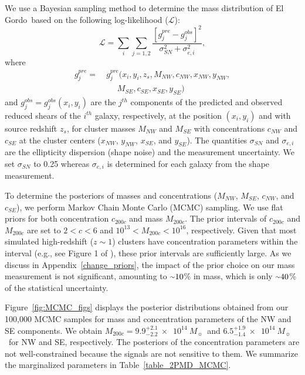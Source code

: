 \documentclass[twocolumn]{aastex631}
\newcommand{\elgordo}{El Gordo}
\newcommand{\mytilde}{\raise.19ex\hbox{$\scriptstyle\sim$}}
\newcommand{\solarm}{$10^{14}~M_{\sun}$}
\begin{document}
We use a Bayesian sampling method to determine the mass distribution of \elgordo~based on the following log-likelihood ($\mathcal{L}$):
\begin{equation}
\mathcal{L} = \sum_{i} \sum_{j=1,2} \frac{ [ g^{pre}_j - g^{obs}_j]^2 } {\sigma_{SN}^2 + \sigma_{e,i}^2}, \label{model2D}
\end{equation}
where 
\begin{align*}
g^{pre}_j = &~g^{pre}_j(x_i,y_i,z_s,M_{NW},c_{NW},x_{NW},y_{NW}, \\
~&~~~~~~~M_{SE},c_{SE},x_{SE},y_{SE})
\end{align*}
and $g^{obs}_j = g^{obs}_j(x_i,y_i)$ are the $j^{th}$ components of the predicted and observed reduced shears of the $i^{th}$ galaxy, respectively, at the position $(x_i,y_i)$ and with source redshift $z_s$, for cluster masses $M_{NW}$ and $M_{SE}$ with concentrations $c_{NW}$ and $c_{SE}$ at the cluster centers ($x_{NW}$, $y_{NW}$, $x_{SE}$, and $y_{SE}$). 
The quantities $\sigma_{SN}$ and $\sigma_{e,i}$ are the ellipticity dispersion (shape noise) and the measurement uncertainty. We set $\sigma_{SN}$ to 0.25 whereas $\sigma_{e,i}$ is determined for each galaxy from the shape measurement.


To determine the posteriors of masses and concentrations ($M_{NW}$, $M_{SE}$, $c_{NW}$, and $c_{SE}$), we perform Markov Chain Monte Carlo (MCMC) sampling. We use flat priors for both concentration $c_{200c}$ and mass $M_{200c}$. 
The prior intervals of $c_{200c}$ and $M_{200c}$ are set to $2 < c < 6$ and $10^{13} < M_{200c} < 10^{16}$, respectively. Given that most simulated high-redshift ($z\sim1$) clusters have concentration parameters within the interval (e.g., see Figure 1 of \citealt{Ludlow2014}), these prior intervals are sufficiently large. 
As we discuss in Appendix~\ref{change_priors}, the impact of the prior choice on our mass measurement is not significant, amounting to $\mytilde10$\% in mass, which is only $\mytilde40$\% of the statistical uncertainty.


Figure~\ref{fig:MCMC_figs} displays the posterior distributions obtained from our 100,000 MCMC samples for mass and concentration parameters of the NW and SE components. 
We obtain $M_{200c} = 9.9^{+2.1}_{-2.2}~\times$~\solarm~and $6.5^{+1.9}_{-1.4}~\times$~\solarm~for NW and SE, respectively. The posteriors of the concentration parameters are not well-constrained because the signals are not sensitive to them. 
We summarize the marginalized parameters in Table~\ref{table_2PMD_MCMC}. 
\end{document}
